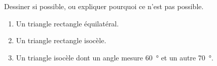 
\begin{exercice}\label{exo2smath-0237}

    Dessiner si possible, ou expliquer pourquoi ce n'est pas possible.
    \begin{enumerate}
        \item
            Un triangle rectangle équilatéral.
        \item
            Un triangle rectangle isocèle.
        \item
            Un triangle isocèle dont un angle mesure \SI{60}{\degree} et un autre \SI{70}{\degree}.
    \end{enumerate}

\end{exercice}
